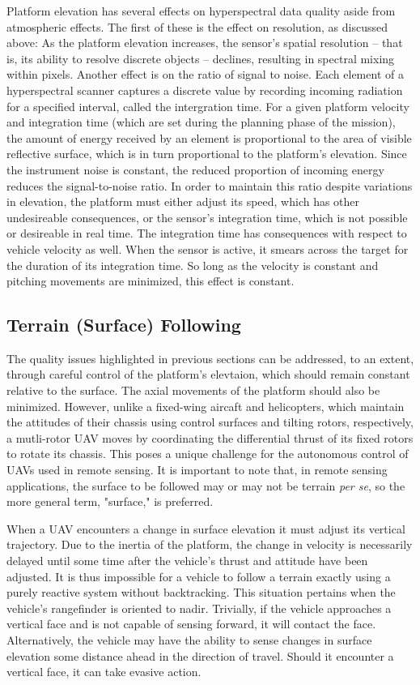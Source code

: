 \documentclass[10pt,a4paper]{report}
\begin{document}
Platform elevation has several effects on hyperspectral data quality aside from atmospheric effects. The first of these is the effect on resolution, as discussed above: As the platform elevation increases, the sensor's spatial resolution -- that is, its ability to resolve discrete objects -- declines, resulting in spectral mixing within pixels. Another effect is on the ratio of signal to noise. Each element of a hyperspectral scanner captures a discrete value by recording incoming radiation for a specified interval, called the intergration time. For a given platform velocity and integration time (which are set during the planning phase of the mission), the amount of energy received by an element is proportional to the area of visible reflective surface, which is in turn proportional to the platform's elevation. Since the instrument noise is constant, the reduced proportion of incoming energy reduces the signal-to-noise ratio. In order to maintain this ratio despite variations in elevation, the platform must either adjust its speed, which has other undesireable consequences, or the sensor's integration time, which is not possible or desireable in real time. The integration time has consequences with respect to vehicle velocity as well. When the sensor is active, it smears across the target for the duration of its integration time. So long as the velocity is constant and pitching movements are minimized, this effect is constant.

\subsection{Terrain (Surface) Following}

The quality issues highlighted in previous sections can be addressed, to an extent, through careful control of the platform's elevtaion, which should remain constant relative to the surface. The axial movements of the platform should also be minimized. However, unlike a fixed-wing aircaft and helicopters, which maintain the attitudes of their chassis using control surfaces and tilting rotors, respectively, a mutli-rotor UAV moves by coordinating the differential thrust of its fixed rotors to rotate its chassis. This poses a unique challenge for the autonomous control of UAVs used in remote sensing. It is important to note that, in remote sensing applications, the surface to be followed may or may not be terrain \emph{per se}, so the more general term, "surface," is preferred.

When a UAV encounters a change in surface elevation it must adjust its vertical trajectory. Due to the inertia of the platform, the change in velocity is necessarily delayed until some time after the vehicle's thrust and attitude have been adjusted. It is thus impossible for a vehicle to follow a terrain exactly using a purely reactive system without backtracking. This situation pertains when the vehicle's rangefinder is oriented to nadir. Trivially, if the vehicle approaches a vertical face and is not capable of sensing forward, it will contact the face.  Alternatively, the vehicle may have the ability to sense changes in surface elevation some distance ahead in the direction of travel. Should it encounter a vertical face, it can take evasive action.
\end{document}
